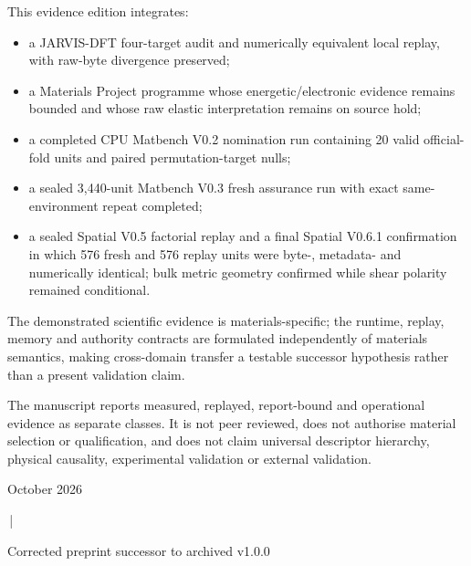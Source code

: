 \documentclass[11pt,a4paper,oneside]{report}
\begin{document}
\begin{titlepage}
\begin{center}
\begin{minipage}{0.90\textwidth}
This evidence edition integrates:
\begin{itemize}
\item a JARVIS-DFT four-target audit and numerically equivalent local replay, with raw-byte divergence preserved;
\item a Materials Project programme whose energetic/electronic evidence remains bounded and whose raw elastic interpretation remains on source hold;
\item a completed CPU Matbench V0.2 nomination run containing 20 valid official-fold units and paired permutation-target nulls;
\item a sealed 3,440-unit Matbench V0.3 fresh assurance run with exact same-environment repeat completed;
\item a sealed Spatial V0.5 factorial replay and a final Spatial V0.6.1 confirmation in which 576 fresh and 576 replay units were byte-, metadata- and numerically identical; bulk metric geometry confirmed while shear polarity remained conditional.
\end{itemize}
The demonstrated scientific evidence is materials-specific; the runtime, replay, memory and authority contracts are formulated independently of materials semantics, making cross-domain transfer a testable successor hypothesis rather than a present validation claim.

The manuscript reports measured, replayed, report-bound and operational evidence as separate classes. It is not peer reviewed, does not authorise material selection or qualification, and does not claim universal descriptor hierarchy, physical causality, experimental validation or external validation.



\end{minipage}



\vspace{0.6cm}



{\small

    October 2026

\,|\,

    Corrected preprint successor to archived v1.0.0

}



\end{center}



\end{titlepage}
\end{document}
